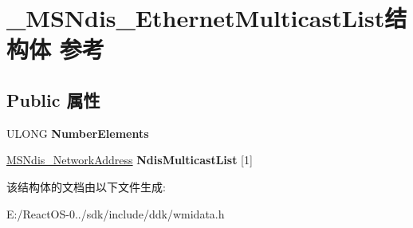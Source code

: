\hypertarget{struct___m_s_ndis___ethernet_multicast_list}{}\section{\+\_\+\+M\+S\+Ndis\+\_\+\+Ethernet\+Multicast\+List结构体 参考}
\label{struct___m_s_ndis___ethernet_multicast_list}
\subsection*{Public 属性}
\begin{DoxyCompactItemize}
\item 
\mbox{\label{struct___m_s_ndis___ethernet_multicast_list_a33bd283e489eaf4e3ae55ad7b9dd844c}} 
U\+L\+O\+NG {\bfseries Number\+Elements}
\item 
\mbox{\label{struct___m_s_ndis___ethernet_multicast_list_aa2f9dc5c959ef5a431880da1c3c07f27}} 
\hyperlink{struct___m_s_ndis___network_address}{M\+S\+Ndis\+\_\+\+Network\+Address} {\bfseries Ndis\+Multicast\+List} \mbox{[}1\mbox{]}
\end{DoxyCompactItemize}


该结构体的文档由以下文件生成\+:\begin{DoxyCompactItemize}
\item 
E\+:/\+React\+O\+S-\/0../sdk/include/ddk/wmidata.\+h\end{DoxyCompactItemize}
